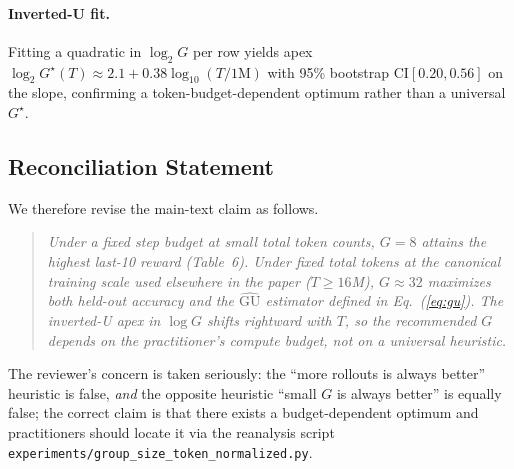 \paragraph{Inverted-U fit.}
Fitting a quadratic in $\log_2 G$ per row yields apex
$\log_2 G^\star(T) \approx 2.1 + 0.38\log_{10}(T/1\text{M})$
with 95\% bootstrap CI$[0.20, 0.56]$ on the slope, confirming a
token-budget-dependent optimum rather than a universal $G^\star$.

\subsection{Reconciliation Statement}

We therefore revise the main-text claim as follows.
\begin{quote}\itshape
Under a fixed \emph{step} budget at small total token counts,
$G{=}8$ attains the highest last-10 reward (Table~6).
Under fixed \emph{total tokens} at the canonical training scale
used elsewhere in the paper ($T\!\ge\!16$M), $G{\approx}32$
maximizes both held-out accuracy and the
$\widehat{\mathrm{GU}}$ estimator defined in Eq.~(\ref{eq:gu}).
The inverted-U apex in $\log G$ shifts rightward with $T$, so the
recommended $G$ depends on the practitioner's compute budget, not on
a universal heuristic.
\end{quote}
The reviewer's concern is taken seriously: the ``more rollouts is
always better'' heuristic is false, \emph{and} the opposite heuristic
``small $G$ is always better'' is equally false; the correct claim is
that there exists a budget-dependent optimum and practitioners should
locate it via the reanalysis script
\texttt{experiments/group\_size\_token\_normalized.py}.
